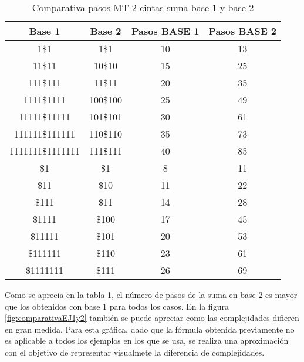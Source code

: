 \documentclass{uc3mpracticas}
\begin{document}
  \begin{table}[!h]
    \centering
  \begin{tabular}{|c|c|c|c|}
  \hline
  \textbf{Base 1}   & \textbf{Base 2} & \textbf{Pasos BASE 1} & \textbf{Pasos BASE 2} \\ \hline
  1\$1     & 1\$1            & 10                    & 13                    \\ \hline
  11\$11   & 10\$10          & 15                    & 25                    \\ \hline
  111\$111 & 11\$11          & 20                    & 35                    \\ \hline
  1111\$1111        & 100\$100        & 25                    & 49                    \\ \hline
  11111\$11111      & 101\$101        & 30                    & 61                    \\ \hline
  111111\$111111    & 110\$110        & 35                    & 73                    \\ \hline
  1111111\$1111111  & 111\$111        & 40                    & 85                    \\ \hline
  \$1               & \$1             & 8                     & 11                    \\ \hline
  \$11              & \$10            & 11                    & 22                    \\ \hline
  \$111             & \$11            & 14                    & 28                    \\ \hline
  \$1111            & \$100           & 17                    & 45                    \\ \hline
  \$11111           & \$101           & 20                    & 53                    \\ \hline
  \$111111          & \$110           & 23                    & 61                    \\ \hline
  \$1111111         & \$111           & 26                    & 69                    \\ \hline
  \end{tabular}
  \caption{Comparativa pasos MT 2 cintas suma base 1 y base 2}
  \label{tab:comparativaSuma}
  \end{table}


  Como se aprecia en la tabla \ref{tab:comparativaSuma}, el número de pasos de la suma en base 2 es mayor que los obtenidos con base 1 para todos los casos. En la figura \ref{fig:comparativaEJ1y2} también se puede apreciar como las complejidades difieren en gran medida. Para esta gráfica, dado que la fórmula obtenida previamente no es aplicable a todos los ejemplos en los que se usa, se realiza una aproximación con el objetivo de representar visualmete la diferencia de complejidades.
\end{document}
